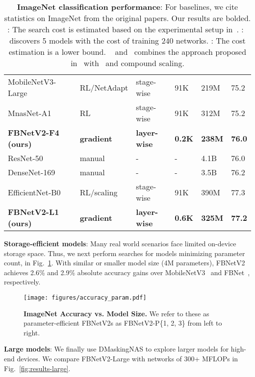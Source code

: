 \documentclass[10pt,twocolumn,letterpaper]{article}
\begin{document}
\begin{table*}[t]
\begin{tabular*}{\textwidth}{l @{\extracolsep{\fill}} lllll}
MobileNetV3-Large~\cite{mobilenetv3} & RL/NetAdapt & stage-wise & 91K & 219M & 75.2 \\
MnasNet-A1 \cite{mnasnet} & RL  & stage-wise & 91K & 312M & 75.2    \\ 
\textbf{FBNetV2-F4 (ours)} & \textbf{gradient} & \textbf{layer-wise}  & \textbf{0.2K} & \textbf{238M} & \textbf{76.0}   \\ \hline
ResNet-50~\cite{resnet} & manual & - & - & 4.1B & 76.0 \\
DenseNet-169~\cite{densenet} & manual & - & - & 3.5B & 76.2 \\
EfficientNet-B0~\cite{efficientnet} & RL/scaling & stage-wise & 91K & 390M & 77.3 \\
\textbf{FBNetV2-L1 (ours)} & \textbf{gradient} & \textbf{layer-wise} & \textbf{0.6K} & \textbf{325M} & \textbf{77.2} \\ \bottomrule
\end{tabular*}
\caption{\small{\textbf{ImageNet classification performance}: For baselines, we cite statistics on ImageNet from the original papers. Our results are bolded. : The search cost is estimated based on the experimental setup in~\cite{mnasnet}.  :~\cite{chamnet} discovers 5 models with the cost of training 240 networks. : The cost estimation is a lower bound. ~\cite{mobilenetv3} and~\cite{efficientnet} combines the approach proposed in~\cite{mnasnet} with~\cite{netadapt} and compound scaling.}}
\label{tab:imagenet}

\end{table*}

\textbf{Storage-efficient models}: 
Many real world scenarios face limited on-device storage space. Thus, we next perform searches for models minimizing parameter count, in Fig.~\ref{fig:results-param-efficient}. With similar or smaller model size (4M parameters), FBNetV2 achieves 2.6\% and 2.9\% absolute accuracy gains over MobileNetV3~\cite{mobilenetv3} and FBNet~\cite{fbnet}, respectively.

\begin{figure}
    \centering
    \texttt{[image: figures/accuracy\_param.pdf]}
    \caption{\textbf{ImageNet Accuracy vs. Model Size.} We refer to these as parameter-efficient FBNetV2s as FBNetV2-P\{1, 2, 3\} from left to right.}
    \label{fig:results-param-efficient}
\end{figure}

\textbf{Large models}: 
We finally use DMaskingNAS to explore larger models for high-end devices. We compare FBNetV2-Large with networks of 300+ MFLOPs in Fig.~\ref{fig:results-large}.
\end{document}
